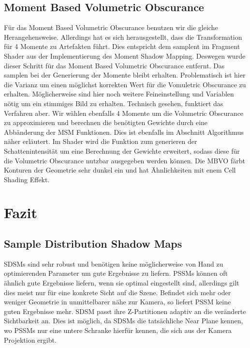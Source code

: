 \documentclass[runningheaders,a4paper]{llncs}
\begin{document}
\subsection{Moment Based Volumetric Obscurance}
Für das Moment Based Volumetric Obscurance benutzen wir die gleiche Herangehensweise. Allerdings hat es sich herausgestellt, dass die Transformation für 4 Momente zu Artefakten führt. Dies entspricht dem samplent im Fragment Shader aus der Implementierung des Moment Shadow Mapping. Deswegen wurde dieser Schritt für das Moment Based Volumetric Obscurance entfernt. Das samplen bei der Generierung der Momente bleibt erhalten. Problematisch ist hier die Varianz um einen möglichst korrekten Wert für die Vomuletric Obscurance zu erhalten. Möglicherweise sind hier noch weitere Feineinstellung und Variablen nötig um ein stimmiges Bild zu erhalten. Technisch gesehen, funktiert das Verfahren aber.
Wir wählen ebenfalls 4 Momente um die Volumetric Obscurance zu approximieren und berechnen die benötigten Gewichte durch eine Abbänderung der MSM Funktionen. Dies ist ebenfalls im Abschnitt Algorithmus näher erläutert.
Im Shader wird die Funktion zum generieren der Schattenintensität um eine Berechnung der Gewichte erweitert, sodass diese für die Volumetric Obscurance nutzbar ausgegeben werden können.
Die MBVO färbt Konturen der Geometrie sehr dunkel ein und hat Ähnlichkeiten mit enem Cell Shading Effekt.



\section{Fazit}


\subsection{Sample Distribution Shadow Maps}
SDSMs sind sehr robust und benötigen keine möglicherweise von Hand zu optimierenden Parameter um gute Ergebnisse zu liefern.
PSSMs können oft ähnlich gute Ergebnisse liefern, wenn sie optimal eingestellt sind, allerdings gilt dies meist nur für eine konkrete Sicht auf die Szene.
Befindet sich mehr oder weniger Geometrie in unmittelbarer nähe zur Kamera, so liefert PSSM keine guten Ergebnisse mehr.
SDSM passt ihre Z-Partitionen adaptiv an die veränderte Sichtbarkeit an.
Dies ist möglich, da SDSMs die tatsächliche Near Plane kennen, wo PSSMs nur eine untere Schranke hierfür kennen, die sich aus der Kamera Projektion ergibt.
\end{document}

